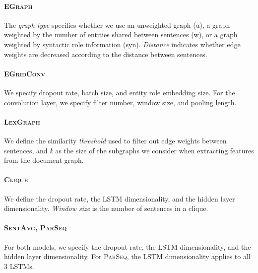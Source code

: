 \documentclass[11pt,a4paper]{article}
\newcommand \egraph{\textsc{EGraph}\xspace}
\newcommand \lexgraph{\textsc{LexGraph}\xspace}
\newcommand \parseq{\textsc{ParSeq}\xspace}
\newcommand \clique{\textsc{Clique}\xspace}
\newcommand \sentavg{\textsc{SentAvg}\xspace}
\newcommand \egridconv{\textsc{EGridConv}\xspace}
\begin{document}
\paragraph{\egraph} The \textit{graph type} specifies whether we use an unweighted graph (u), a graph weighted by the number of entities shared between sentences (w), or a graph weighted by syntactic role information (syn). \textit{Distance} indicates whether edge weights are decreased according to the distance between sentences. 

\paragraph{\egridconv} We specify dropout rate, batch size, and entity role embedding size. For the convolution layer, we specify filter number, window size, and pooling length.

\paragraph{\lexgraph} We define the similarity \textit{threshold} used to filter out edge weights between sentences, and \textit{k} as the size of the subgraphs we consider when extracting features from the document graph.

\paragraph{\clique} We define the dropout rate, the LSTM dimensionality, and the hidden layer dimensionality. \textit{Window size} is the number of sentences in a clique.

\paragraph{\sentavg, \parseq} For both models, we specify the dropout rate, the LSTM dimensionality, and the hidden layer dimensionality. For \parseq, the LSTM dimensionality applies to all 3 LSTMs.
\end{document}
